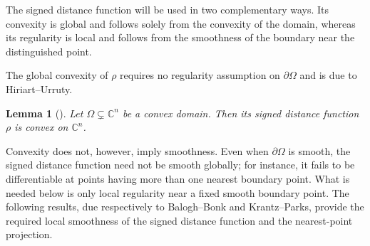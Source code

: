 \documentclass[11pt]{article}
\newtheorem{lemma}[theorem]{Lemma}
\theoremstyle{definition}
\newcommand{\C}{\mathbb{C}}
\begin{document}
The signed distance function will be used in two complementary ways.
Its convexity is global and follows solely from the convexity of the
domain, whereas its regularity is local and follows from the smoothness
of the boundary near the distinguished point.

The global convexity of \(\rho\) requires no regularity assumption on
\(\partial\Omega\) and is due to Hiriart--Urruty.

\begin{lemma}[{\cite[Proposition~4]{HiriartUrruty}}]
	\label{lem:signed-distance-global-convexity}
	Let \(\Omega\subsetneq\C^n\) be a convex domain. Then its signed
	distance function \(\rho\) is convex on \(\C^n\).
\end{lemma}

Convexity does not, however, imply smoothness. Even when
\(\partial\Omega\) is smooth, the signed distance function need not be
smooth globally; for instance, it fails to be differentiable at points
having more than one nearest boundary point. What is needed below is only local regularity near a fixed
smooth boundary point. The following results, due respectively to
Balogh--Bonk and Krantz--Parks, provide the required local smoothness
of the signed distance function and the nearest-point projection.
\end{document}
